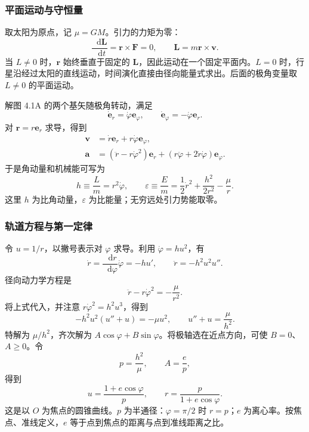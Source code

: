 \documentclass[UTF8,fontset=fandol,a4paper,11pt]{ctexart}
\newcommand{\dd}{\mathop{}\!\mathrm{d}}
\newcommand{\vect}[1]{\bm{#1}}
\newcommand{\figcaption}[1]{\par\vspace{2pt}{\small\color{muted}#1}\par}
\begin{document}
\subsubsection*{平面运动与守恒量}
取太阳为原点，记 $\mu=GM$。引力的力矩为零：
\[
\frac{\dd\vect L}{\dd t}=\vect r\times\vect F=0,
\qquad \vect L=m\vect r\times\vect v.
\]
当 $L\ne0$ 时，$\vect r$ 始终垂直于固定的 $\vect L$，因此运动在一个固定平面内。$L=0$ 时，行星沿经过太阳的直线运动，时间演化直接由径向能量式求出。后面的极角变量取 $L\ne0$ 的平面运动。

\par\medskip\noindent\begin{minipage}{\linewidth}\centering
{}
\figcaption{解图 4.1A　同一点的径向、横向速度与引力。}
\end{minipage}\par\medskip

解图 4.1A 的两个基矢随极角转动，满足
\[
\dot{\vect e}_r=\dot\varphi\vect e_\varphi,
\qquad \dot{\vect e}_\varphi=-\dot\varphi\vect e_r.
\]
对 $\vect r=r\vect e_r$ 求导，得到
\[
\begin{aligned}
\vect v&=\dot r\vect e_r+r\dot\varphi\vect e_\varphi,\\
\vect a&=(\ddot r-r\dot\varphi^2)\vect e_r
 +(r\ddot\varphi+2\dot r\dot\varphi)\vect e_\varphi.
\end{aligned}
\]
于是角动量和机械能可写为
\[
h\equiv\frac Lm=r^2\dot\varphi,\qquad
\varepsilon\equiv\frac Em
=\frac12\dot r^2+\frac{h^2}{2r^2}-\frac\mu r.
\]
这里 $h$ 为比角动量，$\varepsilon$ 为比能量；无穷远处引力势能取零。

\subsubsection*{轨道方程与第一定律}
令 $u=1/r$，以撇号表示对 $\varphi$ 求导。利用 $\dot\varphi=hu^2$，有
\[
\dot r=\frac{\dd r}{\dd\varphi}\dot\varphi=-hu',
\qquad \ddot r=-h^2u^2u''.
\]
径向动力学方程是
\[
\ddot r-r\dot\varphi^2=-\frac\mu{r^2}.
\]
将上式代入，并注意 $r\dot\varphi^2=h^2u^3$，得到
\[
-h^2u^2(u''+u)=-\mu u^2,
\qquad u''+u=\frac\mu{h^2}.
\]
特解为 $\mu/h^2$，齐次解为 $A\cos\varphi+B\sin\varphi$。将极轴选在近点方向，可使 $B=0$、$A\geq0$。令
\[
p=\frac{h^2}\mu,\qquad A=\frac ep,
\]
得到
\[
u=\frac{1+e\cos\varphi}p,
\qquad \boxed{r=\frac p{1+e\cos\varphi}}.
\]
这是以 $O$ 为焦点的圆锥曲线。$p$ 为半通径：$\varphi=\pi/2$ 时 $r=p$；$e$ 为离心率。按焦点、准线定义，$e$ 等于点到焦点的距离与点到准线距离之比。
\end{document}
